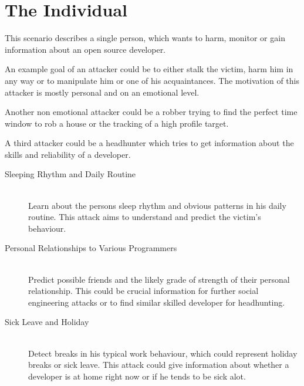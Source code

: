\section{The Individual}
This scenario describes a single person, which wants to harm, monitor or gain information about an open source developer.

An example goal of an attacker could be to either stalk the victim, harm him in any way or to manipulate him or one of his acquaintances.
The motivation of this attacker is mostly personal and on an emotional level.

Another non emotional attacker could be a robber trying to find the perfect time window to rob a house or the tracking of a high profile target.

A third attacker could be a headhunter which tries to get information about the skills and reliability of a developer.

\begin{description}
    \item[Sleeping Rhythm and Daily Routine] \hfill \\
        Learn about the persons sleep rhythm and obvious patterns in his daily routine.
        This attack aims to understand and predict the victim's behaviour.

    \item[Personal Relationships to Various Programmers] \hfill \\
        Predict possible friends and the likely grade of strength of their personal relationship.
        This could be crucial information for further social engineering attacks or to find similar skilled developer for headhunting.

    \item[Sick Leave and Holiday] \hfill \\
        Detect breaks in his typical work behaviour, which could represent holiday breaks or sick leave.
        This attack could give information about whether a developer is at home right now or if he tends to be sick alot.
\end{description}



